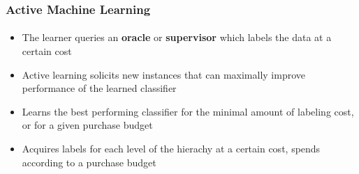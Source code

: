 \documentclass{beamer}
\begin{document}
\begin{frame}
    \frametitle{Active Machine Learning}     %
    \framesubtitle{}
\begin{itemize}
  \item The learner queries an \textbf{oracle} or \textbf{supervisor} which labels the data at a certain cost
  \item Active learning solicits new instances that can maximally improve performance of the learned classifier
  \item Learns the best performing classifier for the minimal amount of labeling cost,
  or for a given purchase budget
  \item Acquires labels for each level of the hierachy at a certain cost, spends according to a purchase budget
\end{itemize}
\end{frame}
\end{document}

